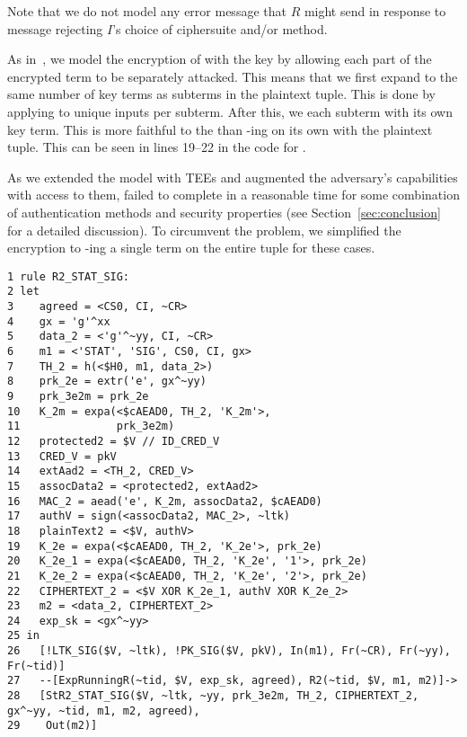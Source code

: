 Note that we do not model any error message that $R$ might send in response
to message \mMsgone rejecting $I$'s choice of ciphersuite and/or method.
%

As in~\cite{Norr21}, we model the \mXor{} encryption of 
 with
the key  by allowing each part of the encrypted term to be
separately attacked.
%
This means that we first expand  to the same number of key terms 
as
subterms in the plaintext tuple.
%
This is done by applying \mHkdfExpand{} to unique inputs per subterm.
%
After this, we \mXor{} each subterm with its own key term.
%
This is more faithful to the \mSpec{} than \mXor-ing  on its own
with the plaintext tuple.
%
This can be seen in lines 19--22 in the code for .
%

As we extended the model with TEEs and augmented the adversary's 
capabilities
with access to them, \mTamarin{} failed to complete in a reasonable time for
some combination of authentication methods and security properties (see 
Section~\ref{sec:conclusion} for a detailed discussion).
%
To circumvent the problem, we simplified the \mXor{} encryption to 
\mXor-ing 
a
single term on the entire tuple for these cases. \\
%

{\parindent 0pt
\begin{minipage}{\textwidth}
\begin{scriptsize}
\begin{verbatim}
1 rule R2_STAT_SIG:
2 let
3    agreed = <CS0, CI, ~CR>
4    gx = 'g'^xx
5    data_2 = <'g'^~yy, CI, ~CR>
6    m1 = <'STAT', 'SIG', CS0, CI, gx>
7    TH_2 = h(<$H0, m1, data_2>)
8    prk_2e = extr('e', gx^~yy)
9    prk_3e2m = prk_2e
10   K_2m = expa(<$cAEAD0, TH_2, 'K_2m'>,
11               prk_3e2m)
12   protected2 = $V // ID_CRED_V
13   CRED_V = pkV
14   extAad2 = <TH_2, CRED_V>
15   assocData2 = <protected2, extAad2>
16   MAC_2 = aead('e', K_2m, assocData2, $cAEAD0)
17   authV = sign(<assocData2, MAC_2>, ~ltk)
18   plainText2 = <$V, authV>
19   K_2e = expa(<$cAEAD0, TH_2, 'K_2e'>, prk_2e)
20   K_2e_1 = expa(<$cAEAD0, TH_2, 'K_2e', '1'>, prk_2e)
21   K_2e_2 = expa(<$cAEAD0, TH_2, 'K_2e', '2'>, prk_2e)
22   CIPHERTEXT_2 = <$V XOR K_2e_1, authV XOR K_2e_2>
23   m2 = <data_2, CIPHERTEXT_2>
24   exp_sk = <gx^~yy>
25 in
26   [!LTK_SIG($V, ~ltk), !PK_SIG($V, pkV), In(m1), Fr(~CR), Fr(~yy), Fr(~tid)]
27   --[ExpRunningR(~tid, $V, exp_sk, agreed), R2(~tid, $V, m1, m2)]->
28   [StR2_STAT_SIG($V, ~ltk, ~yy, prk_3e2m, TH_2, CIPHERTEXT_2, gx^~yy, ~tid, m1, m2, agreed),
29    Out(m2)]
\end{verbatim}
\end{scriptsize}
\end{minipage}}
\vspace{5mm}

